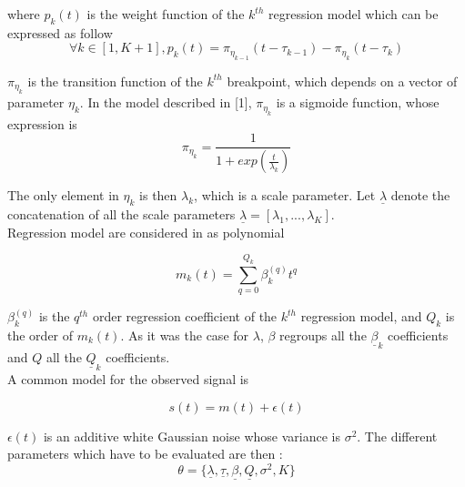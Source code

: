 where $p_k(t)$ is the weight function of the $k^{th}$ regression model which can be expressed as follow
\begin{equation}
\forall k\in [1,K+1], p_k(t)= \pi_{\eta_{k-1}}(t-\tau_{k-1})-\pi_{\eta_{k}}(t-\tau_{k})
\end{equation}

$\pi_{\eta_{k}}$ is the transition function of the $k^{th}$ breakpoint, which depends on a vector of parameter $\eta_{k}$. In the model described in [1], $\pi_{\eta_{k}}$ is a sigmoide function, whose expression is
\begin{equation}
\pi_{\eta_{k}} = \frac{1}{1+exp(\frac{t}{\lambda_k})}
\end{equation}

The only element in $\eta_{k}$ is then $\lambda_k$, which is a scale parameter. Let $\underline{\lambda}$ denote the concatenation of all the scale parameters $\underline{\lambda} = [\lambda_1,...,\lambda_K]$.
\\

 Regression model are considered in \cite{research2} as polynomial

\begin{equation}
m_k(t)= \sum_{q=0}^{Q_k} \beta^{(q)} _kt^q
\end{equation}

$\beta^{(q)} _k$ is the $q^{th}$ order regression coefficient of the $k^{th}$ regression model, and $Q_k$ is the order of $m_k(t)$. As it was the case for $\lambda$, $\beta$ regroups all the $\underline{\beta}_k$ coefficients and $Q$ all the $\underline{Q}_k$ coefficients.
\\

A common model for the observed signal is


\begin{equation}
s(t)=m(t) + \epsilon (t)
\end{equation}

$\epsilon (t)$ is an additive white Gaussian noise whose variance is $\sigma^2$. The different parameters which have to be evaluated are then :
\begin{equation}
\theta=\{\underline{\lambda},\underline{\tau},\underline{\beta},\underline{Q},\sigma ^2,K\}
\end{equation}
\\



